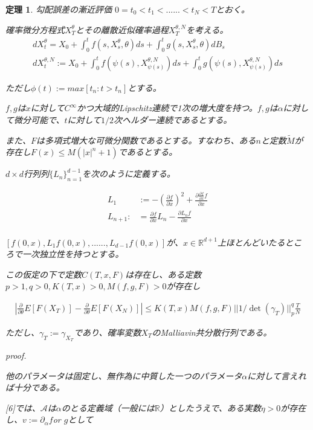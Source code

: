 \documentclass{jsarticle}
\newtheorem{theo}{定理}[section]
\begin{document}
\begin{theo} 勾配誤差の漸近評価
$0=t_0<t_1<......<t_N<T$とおく。

確率微分方程式$X^\theta_T$とその離散近似確率過程$X^{\theta,N}_T$を考える。
\begin{align}
dX^\theta_t=X_0+\int^t_0f(s,X^\theta_s,\theta)ds+\int^t_0g(s,X^\theta_s,\theta)dB_s\\
dX^{\theta,N}_t:= X_0+\int^t_0 f(\psi(s),X^{\theta,N}_{\psi(s)})ds+\int^t_0 g(\psi(s),X^{\theta,N}_{\psi(s)})ds
\end{align}

ただし$\phi(t):=max[t_n:t>t_n]$とする。


$f,g$は$x$に対して$C^\infty$かつ大域的Lipschitz連続で1次の増大度を持つ。$f,g$は$\alpha$に対して微分可能で、$t$に対して$1/2$次ヘルダー連続であるとする。

また、$F$は多項式増大な可微分関数であるとする。すなわち、ある$n$と定数$\tilde{M}$が存在し$F(x)\leq M(|x|^n+1)$であるとする。


$d\times d$行列列$\{L_n\}^{d-1}_{n=1}$を次のように定義する。

\begin{align}
L_1&:=-(\frac{\partial f}{\partial x})^2+\frac{\partial \frac{\partial f}{\partial x}f}{\partial x}\\
L_{n+1}:&=\frac{\partial f}{\partial x}L_n-\frac{\partial L_n f}{\partial x}\\
\end{align}

$[f(0,x),L_1f(0,x),......,L_{d-1}f(0,x)]$が、$x\in \mathbb{R}^{d+1}$上ほとんどいたるところで一次独立性を持つとする。

この仮定の下で定数$C(T,x,F)$は存在し、ある定数$p>1,q>0,K(T,x)>0,M(f,g,F)>0$が存在し


\begin{align}
|\frac{\partial }{\partial \theta}E[F(X_T)]-\frac{\partial }{\partial \theta}E[F(X_N)]|\leq K(T,x)M(f,g,F)||1/\det(\gamma_T)||^q_p\frac{T}{N}
\end{align}


ただし、$\gamma_T:=\gamma_{X_T}$であり、確率変数$X_T$のMalliavin共分散行列である。

proof.

他のパラメータは固定し、無作為に中質した一つのパラメータ$\alpha$に対して言えれば十分である。


[6]では、$\mathcal{A}$は$\alpha$のとる定義域（一般には$\mathbb{R}$）としたうえで、ある実数$\eta>0$が存在し、$v:=\partial_\alpha f $or $g$として


\end{theo}
\end{document}
